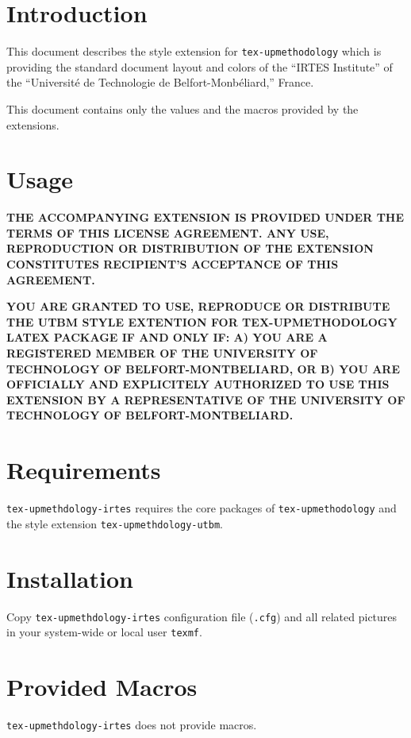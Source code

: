 \documentclass[article]{upmethodology-document}
\begin{document}
\section{Introduction}

This document describes the style extension for \texttt{tex-upmethodology} which is providing the standard document layout and colors of the ``IRTES Institute'' of the ``Universit\'e de Technologie de Belfort-Monb\'eliard,'' France.

This document contains only the values and the macros provided by the extensions.

\section{Usage}

\textbf{THE ACCOMPANYING EXTENSION IS PROVIDED UNDER THE TERMS OF THIS LICENSE AGREEMENT. ANY USE, REPRODUCTION OR DISTRIBUTION OF THE EXTENSION CONSTITUTES RECIPIENT'S ACCEPTANCE OF THIS AGREEMENT.}

\textbf{YOU ARE GRANTED TO USE, REPRODUCE OR DISTRIBUTE THE UTBM STYLE EXTENTION FOR TEX-UPMETHODOLOGY LATEX PACKAGE IF AND ONLY IF: A) YOU ARE A REGISTERED MEMBER OF THE UNIVERSITY OF TECHNOLOGY OF BELFORT-MONTBELIARD, OR B) YOU ARE OFFICIALLY AND EXPLICITELY AUTHORIZED TO USE THIS EXTENSION BY A REPRESENTATIVE OF THE UNIVERSITY OF TECHNOLOGY OF BELFORT-MONTBELIARD.}

\section{Requirements}

\texttt{tex-upmethdology-irtes} requires the core packages of \texttt{tex-upmethodology} and the style extension \texttt{tex-upmethdology-utbm}.

\section{Installation}

Copy \texttt{tex-upmethdology-irtes} configuration file (\texttt{.cfg}) and all related pictures in your system-wide or local user \texttt{texmf}.

\section{Provided Macros}

\texttt{tex-upmethdology-irtes} does not provide macros.
\end{document}
